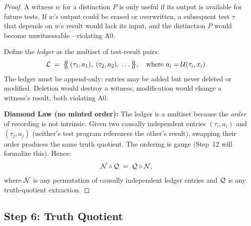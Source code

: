 \begin{proof}
A witness $w$ for a distinction $P$ is only useful if its output is
available for future tests.  If $w$'s output could be erased or
overwritten, a subsequent test $\tau$ that depends on $w$'s result
would lack its input, and the distinction $P$ would become
unwitnessable---violating A0.

Define the \emph{ledger} as the multiset of test-result pairs:
\[
  \mathcal{L} \;=\; \bigl\{\!\!\bigl\{\,(\tau_1, a_1),\; (\tau_2, a_2),\;
    \ldots\,\bigr\}\!\!\bigr\},
  \quad \text{where } a_i = \mathcal{U}(\tau_i, x_i).
\]
The ledger must be append-only: entries may be added but never deleted or
modified.  Deletion would destroy a witness; modification would change a
witness's result, both violating A0.

\textbf{Diamond Law (no minted order):}  The ledger is a multiset because
the \emph{order} of recording is not intrinsic.  Given two causally
independent entries $(\tau_i, a_i)$ and $(\tau_j, a_j)$ (neither's test
program references the other's result), swapping their order produces the
same truth quotient.  The ordering is gauge (Step~12 will formalize this).
Hence:
\[
  \mathcal{N} \circ \mathcal{Q} \;=\; \mathcal{Q} \circ \mathcal{N},
\]
where $\mathcal{N}$ is any permutation of causally independent ledger entries
and $\mathcal{Q}$ is any truth-quotient extraction.

\end{proof}


\subsection{Step 6: Truth Quotient}\label{app:step6}

